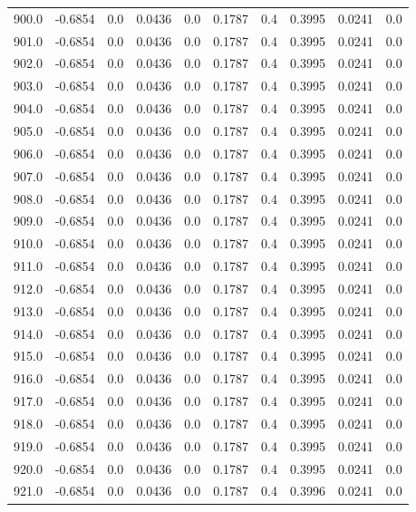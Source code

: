 \begin{longtable}{lrrrrrrrrr}
900.0 & -0.6854 & 0.0 & 0.0436 & 0.0 & 0.1787 & 0.4 & 0.3995 & 0.0241 & 0.0 \\
901.0 & -0.6854 & 0.0 & 0.0436 & 0.0 & 0.1787 & 0.4 & 0.3995 & 0.0241 & 0.0 \\
902.0 & -0.6854 & 0.0 & 0.0436 & 0.0 & 0.1787 & 0.4 & 0.3995 & 0.0241 & 0.0 \\
903.0 & -0.6854 & 0.0 & 0.0436 & 0.0 & 0.1787 & 0.4 & 0.3995 & 0.0241 & 0.0 \\
904.0 & -0.6854 & 0.0 & 0.0436 & 0.0 & 0.1787 & 0.4 & 0.3995 & 0.0241 & 0.0 \\
905.0 & -0.6854 & 0.0 & 0.0436 & 0.0 & 0.1787 & 0.4 & 0.3995 & 0.0241 & 0.0 \\
906.0 & -0.6854 & 0.0 & 0.0436 & 0.0 & 0.1787 & 0.4 & 0.3995 & 0.0241 & 0.0 \\
907.0 & -0.6854 & 0.0 & 0.0436 & 0.0 & 0.1787 & 0.4 & 0.3995 & 0.0241 & 0.0 \\
908.0 & -0.6854 & 0.0 & 0.0436 & 0.0 & 0.1787 & 0.4 & 0.3995 & 0.0241 & 0.0 \\
909.0 & -0.6854 & 0.0 & 0.0436 & 0.0 & 0.1787 & 0.4 & 0.3995 & 0.0241 & 0.0 \\
910.0 & -0.6854 & 0.0 & 0.0436 & 0.0 & 0.1787 & 0.4 & 0.3995 & 0.0241 & 0.0 \\
911.0 & -0.6854 & 0.0 & 0.0436 & 0.0 & 0.1787 & 0.4 & 0.3995 & 0.0241 & 0.0 \\
912.0 & -0.6854 & 0.0 & 0.0436 & 0.0 & 0.1787 & 0.4 & 0.3995 & 0.0241 & 0.0 \\
913.0 & -0.6854 & 0.0 & 0.0436 & 0.0 & 0.1787 & 0.4 & 0.3995 & 0.0241 & 0.0 \\
914.0 & -0.6854 & 0.0 & 0.0436 & 0.0 & 0.1787 & 0.4 & 0.3995 & 0.0241 & 0.0 \\
915.0 & -0.6854 & 0.0 & 0.0436 & 0.0 & 0.1787 & 0.4 & 0.3995 & 0.0241 & 0.0 \\
916.0 & -0.6854 & 0.0 & 0.0436 & 0.0 & 0.1787 & 0.4 & 0.3995 & 0.0241 & 0.0 \\
917.0 & -0.6854 & 0.0 & 0.0436 & 0.0 & 0.1787 & 0.4 & 0.3995 & 0.0241 & 0.0 \\
918.0 & -0.6854 & 0.0 & 0.0436 & 0.0 & 0.1787 & 0.4 & 0.3995 & 0.0241 & 0.0 \\
919.0 & -0.6854 & 0.0 & 0.0436 & 0.0 & 0.1787 & 0.4 & 0.3995 & 0.0241 & 0.0 \\
920.0 & -0.6854 & 0.0 & 0.0436 & 0.0 & 0.1787 & 0.4 & 0.3995 & 0.0241 & 0.0 \\
921.0 & -0.6854 & 0.0 & 0.0436 & 0.0 & 0.1787 & 0.4 & 0.3996 & 0.0241 & 0.0 \\

\end{longtable}
